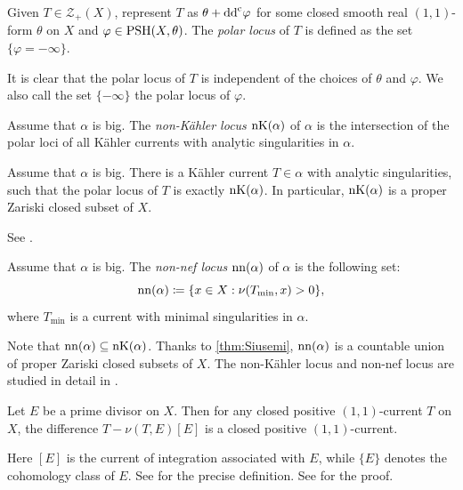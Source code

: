 \begin{definition}\label{def:polarlocus}
    Given $T\in \mathcal{Z}_+(X)$, represent $T$ as $\theta+\mathrm{dd}^{\mathrm{c}}\varphi$ for some closed smooth real $(1,1)$-form $\theta$ on $X$ and $\varphi\in \mathrm{PSH}(X,\theta)$. The \emph{polar locus} of $T$ is defined as the set $\{\varphi=-\infty\}$.
\end{definition}
It is clear that the polar locus of $T$ is independent of the choices of $\theta$ and $\varphi$. We also call the set $\{-\infty\}$ the polar locus of $\varphi$.

\begin{definition}\label{def:nKlocus}
    Assume that $\alpha$ is big. The \emph{non-Kähler locus} $\nK(\alpha)$\index{$\nK(\alpha)$} of $\alpha$ is the intersection of the polar loci of all Kähler currents with analytic singularities in $\alpha$.
\end{definition}
\begin{theorem}[Boucksom]\label{thm:pshfunctions:L1641}
Assume that $\alpha$ is big.
    There is a Kähler current $T\in \alpha$ with analytic singularities, such that the polar locus of $T$ is exactly $\nK(\alpha)$. In particular, $\nK(\alpha)$ is a proper Zariski closed subset of $X$.
\end{theorem}
See \cite[Théorème~2.1.20]{Bou02}.

\begin{definition}\label{def:nnlocus}
     Assume that $\alpha$ is big. The \emph{non-nef locus} $\nn(\alpha)$\index{$\nn(\alpha)$} of $\alpha$ is the following set:
     \[
     \operatorname{nn}(\alpha)\coloneqq \{x\in X :\nu(T_{\min},x)>0\},
     \]
     where $T_{\min}$ is a current with minimal singularities in $\alpha$.
\end{definition}
Note that $\operatorname{nn}(\alpha)\subseteq \operatorname{nK}(\alpha)$. Thanks to \cref{thm:Siusemi}, $\nn(\alpha)$ is a countable union of proper Zariski closed subsets of $X$. The non-Kähler locus and non-nef locus are studied in detail in \cite{Bou02}.


\begin{lemma}\label{lma:Siudec}
    Let $E$ be a prime divisor on $X$. Then for any closed positive $(1,1)$-current $T$ on $X$, the difference $T-\nu(T,E)[E]$ is a closed positive $(1,1)$-current.
\end{lemma}
Here $[E]$ is the current of integration associated with $E$, while $\{E\}$ denotes the cohomology class of $E$. See \cite[Page~386, Example~1]{GH14} for the precise definition. See \cite[Lemma~2.17]{Dem12} for the proof.


